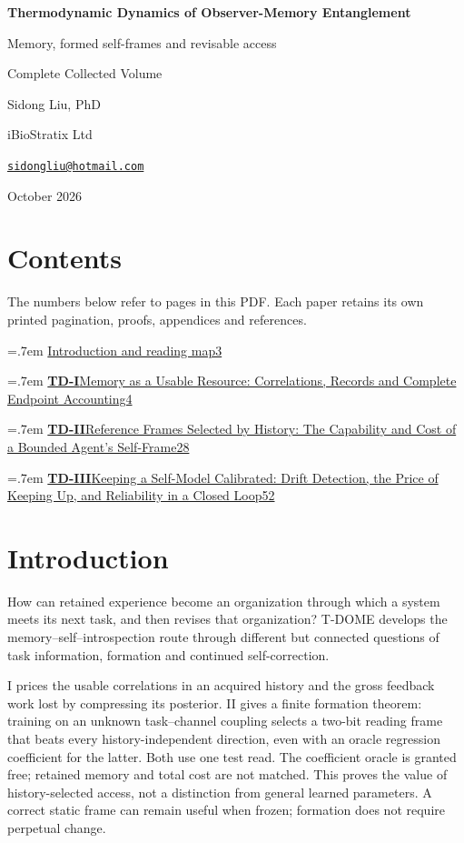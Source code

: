 \documentclass[11pt,a4paper]{article}
\newcommand{\volumeentry}[3]{\par\begingroup\parskip=.7em
  \noindent\href{TDOME_Complete_Collection.pdf\#page=#3}{\textbf{#1}\quad #2\nobreak\dotfill\nobreak\mbox{#3}}\par\endgroup}
\begin{document}
\begin{titlepage}
\centering
\vspace*{1.6cm}
{\Huge\bfseries Thermodynamic Dynamics of Observer-Memory Entanglement\par}
\vspace{1cm}
{\Large Memory, formed self-frames and revisable access\par}
\vfill
{\Large Complete Collected Volume\par}
\vspace{1.6cm}
{\Large Sidong Liu, PhD\par}
\vspace{.3cm}
{iBioStratix Ltd\par}
\href{mailto:sidongliu@hotmail.com}{\texttt{sidongliu@hotmail.com}}\par
\vspace{1cm}
{\large October 2026\par}
\end{titlepage}
\setcounter{page}{2}
\section*{Contents}
The numbers below refer to pages in this PDF. Each paper retains its own printed pagination, proofs, appendices and references.
\volumeentry{}{Introduction and reading map}{3}
\volumeentry{TD-I}{Memory as a Usable Resource: Correlations, Records and Complete Endpoint Accounting}{4}
\volumeentry{TD-II}{Reference Frames Selected by History: The Capability and Cost of a Bounded Agent's Self-Frame}{28}
\volumeentry{TD-III}{Keeping a Self-Model Calibrated: Drift Detection, the Price of Keeping Up, and Reliability in a Closed Loop}{52}
\clearpage
\section*{Introduction}\label{collection:intro}
How can retained experience become an organization through which a system meets its next task, and then revises that organization? T-DOME develops the memory--self--introspection route through different but connected questions of task information, formation and continued self-correction.

I prices the usable correlations in an acquired history and the gross feedback work lost by compressing its posterior. II gives a finite formation theorem: training on an unknown task--channel coupling selects a two-bit reading frame that beats every history-independent direction, even with an oracle regression coefficient for the latter. Both use one test read. The coefficient oracle is granted free; retained memory and total cost are not matched. This proves the value of history-selected access, not a distinction from general learned parameters. A correct static frame can remain useful when frozen; formation does not require perpetual change.
\end{document}
